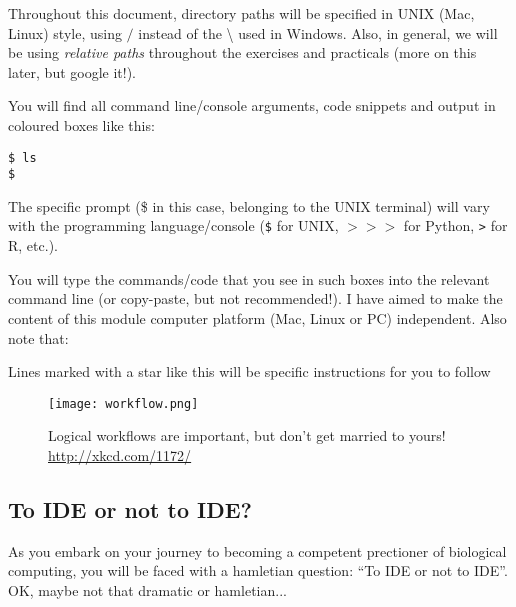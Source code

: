 Throughout this document, directory paths will be specified in UNIX 
(Mac, Linux) style, using $/$ instead of the \textbackslash{} used in 
Windows. Also, in general, we will be using {\it relative paths} 
throughout the exercises and practicals (more on this later, but google 
it!).

You will find all command line/console arguments, code snippets and 
output in coloured boxes like this:
\begin{lstlisting}
$ ls 
$
\end{lstlisting}
The specific prompt (\$ in this case, belonging to the UNIX terminal) 
will vary with the programming language/console ({\tt \$} for UNIX, 
$>>>$ for Python, {\tt >} for R, etc.).

You will type the commands/code that you see in such boxes 
into the relevant command line (or copy-paste, but not recommended!). I 
have aimed to make the content of this module computer platform (Mac, 
Linux or PC) independent. Also note that:\\

\begin{compactitem}[$\quad\star$]\itemsep4pt
	\item Lines marked with a star like this will be specific 
	instructions for you to follow
\end{compactitem}

\begin{wrapfigure}[20]{c}{0.4\textwidth}
 \texttt{[image: workflow.png]}
	\caption{\label{fig:Workflows} Logical workflows are important, but 
	don't get married to yours! \url{http://xkcd.com/1172/} } 
\end{wrapfigure}

\subsection{To IDE or not to IDE?}

As you embark on your journey to becoming a competent prectioner of 
biological computing, you will be faced with a hamletian question: ``To 
IDE or not to IDE''. OK, maybe not that dramatic or hamletian... 

